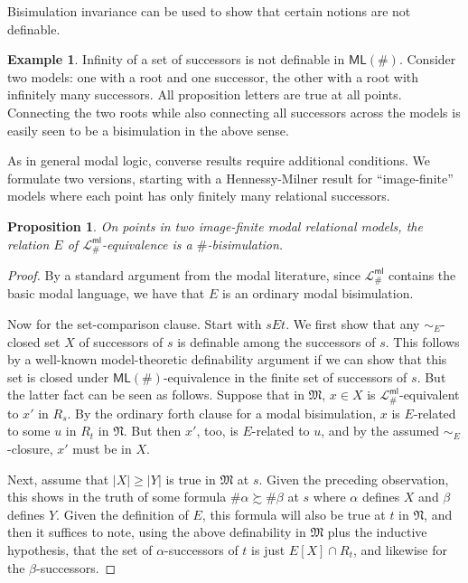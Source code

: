 \documentclass[12pt,oneside,reqno]{amsart}
\newtheorem{proposition}{Proposition}
\theoremstyle{definition}
\newtheorem{example}{Example}
\begin{document}
\vspace{1ex}

Bisimulation invariance can be used to show that certain notions are not definable. 

\begin{example} Infinity of a set of successors is not definable in $\mathsf{ML}(\#)$. Consider two models: one with a root and one successor, the other with a root with infinitely many successors. All proposition letters are true at all points. Connecting the two roots while also connecting all successors across the models is easily seen to be a bisimulation in the above sense.
\end{example}




As in general modal logic, converse results require additional conditions. We formulate two versions, starting  with a Hennessy-Milner result for ``image-finite'' models where each point has only finitely many relational successors.

\begin{proposition} On points in two image-finite modal relational models, the relation $E$ of $\mathcal{L}_\#^{\mathsf{ml}}$-equivalence is a $\#$-bisimulation.\end{proposition}

\begin{proof} By a standard argument from the modal literature, since $\mathcal{L}_\#^{\mathsf{ml}}$ contains the basic modal language, we have that $E$ is an ordinary modal bisimulation. 

Now for the set-comparison clause.
Start with $s E t$. We first show that any  $\sim_E$-closed set $X$ of successors of $s$ %
is definable among the successors of $s$. This follows by a well-known model-theoretic definability argument if we can  show that this set is closed under $\mathsf{ML}(\#)$-equivalence in the finite set of successors of $s$. But the latter fact can be seen as follows. Suppose that in $\mathfrak{M}$, $x \in X$ is  $\mathcal{L}_\#^{\mathsf{ml}}$-equivalent to $x'$ in $R_s$. By the ordinary forth clause for a modal bisimulation, $x$ is $E$-related to some $u$ in $R_t$ in $\mathfrak{N}$. But then $x'$, too, is $E$-related to $u$, and by  the assumed $\sim_E$-closure,
$x'$ must be in $X$. 

Next, assume that $|X| \geq |Y|$ is true in $\mathfrak{M}$ at $s$. Given the preceding observation, this  shows in the truth of some formula $\#\alpha \succsim \#\beta$ at $s$ where $\alpha$ defines $X$ and $\beta$ defines $Y$. Given the definition of $E$, this formula will also be true at $t$ in $\mathfrak{N}$, and then it suffices to note, using the above definability in $\mathfrak{M}$ plus the inductive hypothesis, that the set of $\alpha$-successors of $t$ is just $E[X] \cap R_t$, and likewise for the $\beta$-successors. \end{proof}
\end{document}
